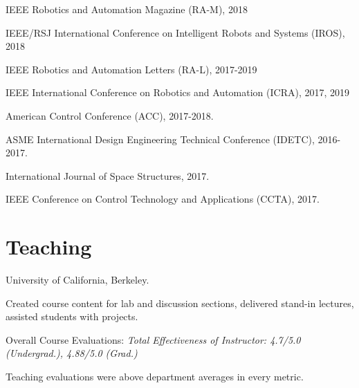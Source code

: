 \documentclass[letterpaper]{deedy-resume} %
\begin{document}
{\begin{tightitemize}
\item IEEE Robotics and Automation Magazine (RA-M), 2018

\item IEEE/RSJ International Conference on Intelligent Robots and Systems (IROS), 2018

\item IEEE Robotics and Automation Letters (RA-L), 2017-2019
  
\item IEEE International Conference on Robotics and Automation (ICRA), 2017, 2019

\item American Control Conference (ACC), 2017-2018.

\item ASME International Design Engineering Technical Conference (IDETC), 2016-2017.

\item International Journal of Space Structures, 2017.

\item IEEE Conference on Control Technology and Applications (CCTA), 2017.

\end{tightitemize}


\section{Teaching}

\vspace{0.2cm}


{{} University of California, Berkeley.
  
\begin{tightitemize}
\item Created course content for lab and discussion sections, delivered stand-in lectures, assisted students with projects.
\item Overall Course Evaluations: {\it Total Effectiveness of Instructor: 4.7/5.0 (Undergrad.), 4.88/5.0 (Grad.)}
\item Teaching evaluations were above department averages in every metric.
\end{tightitemize}}

}
\end{document}
